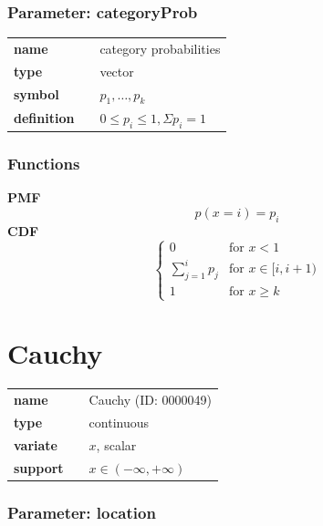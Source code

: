 \subsubsection*{Parameter: categoryProb}

\noindent\begin{tabular}{p{2cm}cl}
\textbf{name} & & category probabilities \\
\textbf{type} & & vector \\
\textbf{symbol} & & $p_1, \ldots, p_k$  \\
\textbf{definition} & & $0 \leq p_i \leq 1, \Sigma p_i = 1$
\end{tabular}
\subsubsection*{Functions}

\smallskip \noindent \hspace{.2cm} \textbf{PMF} 
\begin{equation*}p(x=i)=p_i\end{equation*}
\smallskip \noindent \hspace{.2cm} \textbf{CDF} 
\begin{equation*}\begin{cases}
    0 & \text{for }x<1 \\
    \sum_{j=1}^i p_j & \text{for }x \in [i,i+1) \\
    1 & \text{for }x \geq k
    \end{cases}\end{equation*}
\smallskip\section*{Cauchy} 

  \bigskip 

\begin{tabular}{p{2cm}cl}
\textbf{name} & & Cauchy (ID: 0000049)\\ 
 
\textbf{type} & & continuous \\ 

\textbf{variate} & & $x$, scalar \\ 

\textbf{support} & & $x \in (-\infty,+\infty)$
\end{tabular}
\subsubsection*{Parameter: location}

